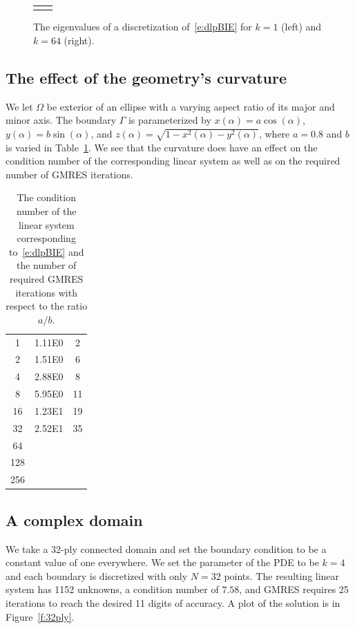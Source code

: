 \documentclass[final]{siamltex}
\begin{document}
\begin{figure}[htps]
\centering
\begin{tabular}{cc}
 &

\end{tabular}
\caption{\label{f:evalues} The eigenvalues of a discretization
of~\eqref{e:dlpBIE} for $k=1$ (left) and $k=64$ (right).}
\end{figure}


\subsection{The effect of the geometry's curvature}
We let $\Omega$ be exterior of an ellipse with a varying aspect ratio of
its major and minor axis.  The boundary $\Gamma$ is parameterized by
$x(\alpha) = a\cos(\alpha)$, $y(\alpha) = b\sin(\alpha)$, and $z(\alpha)
= \sqrt{1-x^{2}(\alpha)-y^{2}(\alpha)}$, where $a = 0.8$ and $b$ is
varied in Table~\ref{t:example3}.  We see that the curvature does have
an effect on the condition number of the corresponding linear system as
well as on the required number of GMRES iterations.

\begin{table}[htps]
\centering
\begin{tabular}{c>{\centering}m{2cm}c}
\hline
1   & 1.11E0 & 2  \\ 
2   & 1.51E0 & 6  \\
4   & 2.88E0 & 8  \\
8   & 5.95E0 & 11 \\
16  & 1.23E1 & 19 \\
32  & 2.52E1 & 35 \\
64  & \\
128 & \\
256 &
\end{tabular}
\caption{\label{t:example3} The condition number of the linear system
corresponding to~\eqref{e:dlpBIE} and the number of required GMRES
iterations with respect to the ratio $a/b$.}
\end{table}


\subsection*{A complex domain}
We take a 32-ply connected domain and set the boundary condition to be a
constant value of one everywhere.  We set the parameter of the PDE to be
$k=4$ and each boundary is discretized with only $N=32$ points.  The
resulting linear system has 1152 unknowns, a condition number of $7.58$,
and GMRES requires 25 iterations to reach the desired 11 digits of
accuracy.  A plot of the solution is in Figure~\ref{f:32ply}.
\end{document}
